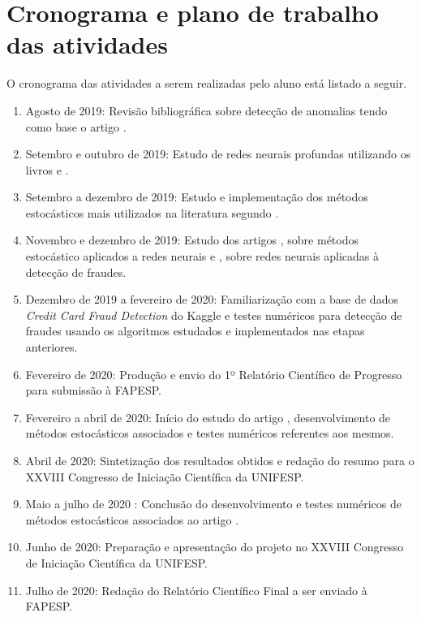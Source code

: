 \documentclass[a4paper,12pt]{article}
\begin{document}
\section{Cronograma e plano de trabalho das atividades}
O cronograma das atividades a serem realizadas pelo aluno está listado a seguir. 
\begin{enumerate}

	\item Agosto de 2019: Revisão bibliográfica sobre detecção de anomalias tendo como base o artigo \cite{Chandola:2009}.
	\item Setembro e outubro de 2019: Estudo  de redes neurais profundas utilizando os livros \cite{livroWeldon} e \cite{livroGoodfellow}.
	\item Setembro a dezembro de 2019: Estudo e implementação dos métodos estocásticos mais utilizados na literatura segundo \cite{livroGoodfellow}.
	\item Novembro e dezembro de 2019: Estudo dos artigos \cite{TCCLF, TCCKleber}, sobre métodos estocástico aplicados a redes neurais   e \cite{fraudeItalia1,fraudeItalia2}, sobre redes neurais aplicadas à detecção de fraudes.
	\item Dezembro de 2019 a fevereiro de 2020: Familiarização com a base de dados  \textit{Credit Card Fraud Detection} do  Kaggle e testes numéricos para detecção de fraudes usando os algoritmos estudados e implementados nas etapas anteriores.
	\item Fevereiro de 2020: Produção e envio do 1º Relatório Científico de Progresso para submissão à FAPESP.
	\item Fevereiro a abril de 2020: Início do estudo do artigo \cite{bmLS}, desenvolvimento de métodos estocásticos associados e testes numéricos referentes aos mesmos.
	\item Abril de 2020: Sintetização dos resultados obtidos e redação do resumo para o XXVIII Congresso de Iniciação Científica da UNIFESP.
	\item Maio a julho de 2020 : Conclusão do desenvolvimento e testes numéricos  de métodos estocásticos associados ao artigo \cite{bmLS}.
	\item Junho de 2020: Preparação  e apresentação do projeto no XXVIII Congresso de Iniciação Científica da UNIFESP.
	\item Julho de 2020: Redação do Relatório Científico Final a ser enviado à FAPESP. \\
	
	
\end{enumerate}
\end{document}
